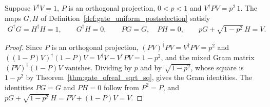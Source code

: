 \begin{theorem}
    \label{thm:gate_uniform_postselection_decomposition}
    \leanok
    Suppose $V^\dagger V=1$, $P$ is an orthogonal projection, $0<p<1$ and
    $V^\dagger PV=p^2\,1$. The maps $G,H$ of
    Definition~\ref{def:gate_uniform_postselection} satisfy
    \begin{align}
        G^\dagger G=H^\dagger H=1,\qquad G^\dagger H=0,
        \qquad PG=G,\quad PH=0,
        \qquad pG+\sqrt{1-p^2}\,H=V.
    \end{align}
\end{theorem}
\begin{proof}\leanok
    Since $P$ is an orthogonal projection, $(PV)^\dagger PV=V^\dagger PV=p^2$
    and $((1-P)V)^\dagger(1-P)V=V^\dagger V-V^\dagger PV=1-p^2$, and the
    mixed Gram matrix $(PV)^\dagger(1-P)V$ vanishes. Dividing by $p$ and by
    $\sqrt{1-p^2}$, whose square is $1-p^2$ by
    Theorem~\ref{thm:gate_ofreal_sqrt_sq}, gives the Gram identities. The
    identities $PG=G$ and $PH=0$ follow from $P^2=P$, and
    $pG+\sqrt{1-p^2}\,H=PV+(1-P)V=V$.
\end{proof}

